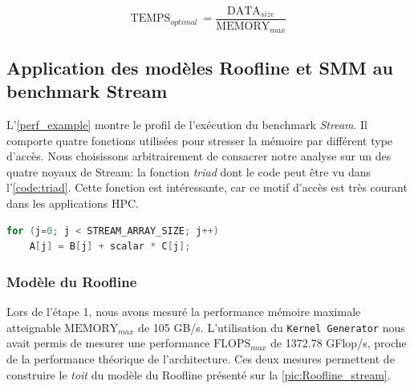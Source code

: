     \begin{equation}
        \text{TEMPS}_{optimal}\ = \frac{\text{DATA}_{size}}{\text{MEMORY}_{max}}
    \end{equation}





\subsection{Application des modèles Roofline et SMM au benchmark Stream}
    
    L'\autoref{perf_example} montre le profil de l'exécution du benchmark \textit{Stream}. Il comporte quatre fonctions utilisées pour stresser la mémoire par différent type d'accès. Nous choisissons arbitrairement de consacrer notre analyse sur un des quatre noyaux de Stream: la fonction \textit{triad} dont le code peut être vu dans l'\autoref{code:triad}. Cette fonction est intéressante, car ce motif d'accès est très courant dans les applications HPC.
    
    
\begin{lstlisting}[language=c,caption= La fonction triad du benchmark Stream utilise trois matrices: deux en lecture et une en écriture,label={code:triad}, 
  basicstyle=\footnotesize, frame=tb,
  xleftmargin=.065\textwidth, xrightmargin=.065\textwidth]
for (j=0; j < STREAM_ARRAY_SIZE; j++)
    A[j] = B[j] + scalar * C[j];
\end{lstlisting}
        
        
    
    \subsubsection{Modèle du Roofline}
        Lors de l'étape 1, nous avons mesuré la performance mémoire maximale atteignable $\text{MEMORY}_{max}$ de 105 GB/s. L'utilisation du \verb|Kernel Generator| nous avait permis de mesurer une performance $\text{FLOPS}_{max}$ de 1372.78 GFlop/s, proche de la performance théorique de l'architecture. Ces deux mesures permettent de construire le \textit{toit} du modèle du Roofline présenté sur la \autoref{pic:Roofline_stream}.
        
